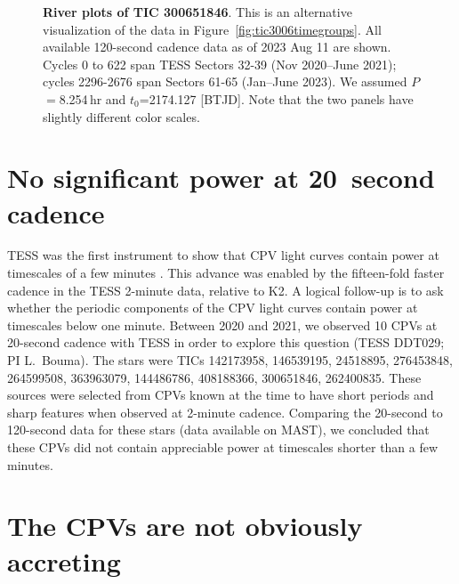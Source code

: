 \documentclass[11pt,twocolumn,tighten]{aastex63}
\begin{document}
\begin{figure*}[!t]
	\begin{center}
	\end{center}
	\vspace{-0.4cm}
	\caption{
		{\bf River plots of TIC 300651846}.
    This is an alternative visualization of the data in
    Figure~\ref{fig:tic3006timegroups}.  All available 120-second
    cadence data as of 2023 Aug 11 are shown.  Cycles 0 to 622 span
    TESS Sectors 32-39 (Nov 2020--June 2021); cycles 2296-2676 span
    Sectors 61-65 (Jan--June 2023).  We assumed $P$$=$8.254\,hr and
    $t_0$=2174.127 [BTJD].  Note that the two panels have slightly
    different color scales.
	}
	\label{fig:tic3006river}
\end{figure*}



\section{No significant power at 20~second cadence}

TESS was the first instrument to show that CPV light curves contain
power at timescales of a few minutes
\citep{2019ApJ...876..127Z,2022AJ....163..144G}.  This advance was
enabled by the fifteen-fold faster cadence in the TESS 2-minute data,
relative to K2.  A logical follow-up is to ask whether the periodic
components of the CPV light curves contain power at timescales below
one minute.  Between 2020 and 2021, we observed 10 CPVs at 20-second
cadence with TESS in order to explore this question (TESS DDT029; PI L.~Bouma).
The stars were TICs 142173958, 146539195, 24518895, 276453848,
264599508, 363963079, 144486786, 408188366, 300651846, 262400835.
These sources were selected from CPVs known at the time to have short
periods and sharp features when observed at 2-minute cadence.
Comparing the 20-second to 120-second data for these stars (data
available on MAST), we concluded that these CPVs did not contain
appreciable power at timescales shorter than a few minutes.


\section{The CPVs are not obviously accreting}
\end{document}
